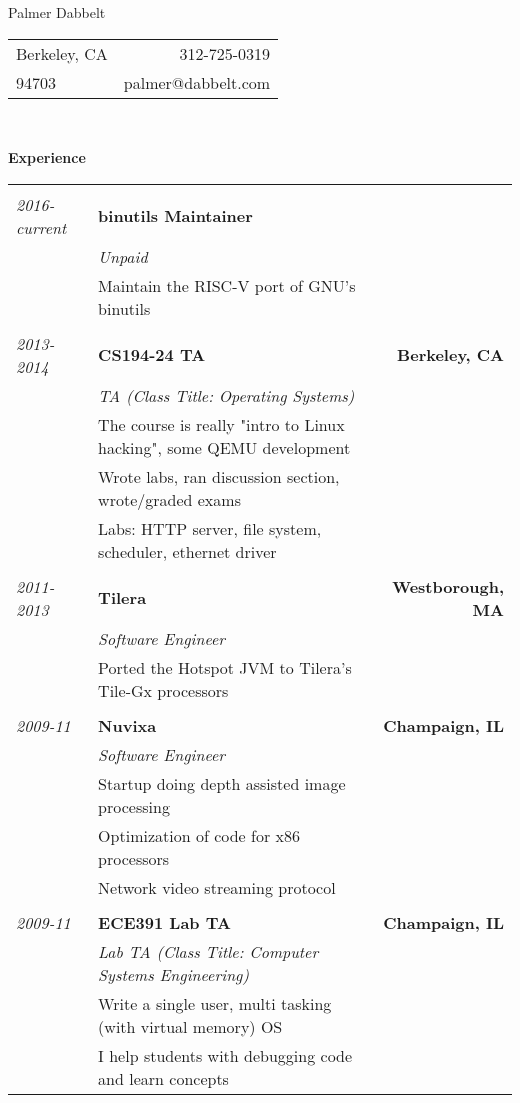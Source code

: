 \documentclass{letter}
\newcommand{\experience}[4]{&& \\
\textit{#1} \hspace{0.2in} & \textbf{#2} & \textbf{#3} \\
& \textit{#4} & \\}
\newcommand{\subexperience}[1]{& #1 & \\}
\begin{document}
\thispagestyle{empty}

\LARGE
\begin{center}Palmer Dabbelt\end{center}
\normalsize

\begin{tabular*}{\textwidth}{@{\extracolsep{\fill}} l r}
  Berkeley, CA& 312-725-0319 \\
  94703 & palmer@dabbelt.com \\
  \hline
\end{tabular*}\\
\vspace{0.2in}

\textbf{Experience}\\
\begin{tabular*}{\textwidth}{l l @{\extracolsep{\fill}} r}
  \experience{2016-current}{binutils Maintainer}{}{Unpaid}
  \subexperience{Maintain the RISC-V port of GNU's binutils}

  \experience{2013-2014}{CS194-24 TA}{Berkeley, CA}{TA (Class Title: Operating Systems)}
  \subexperience{The course is really "intro to Linux hacking", some QEMU development}
  \subexperience{Wrote labs, ran discussion section, wrote/graded exams}
  \subexperience{Labs: HTTP server, file system, scheduler, ethernet driver}

  \experience{2011-2013}{Tilera}{Westborough, MA}{Software Engineer}
  \subexperience{Ported the Hotspot JVM to Tilera's Tile-Gx processors}

  \experience{2009-11}{Nuvixa}{Champaign, IL}{Software Engineer}
  \subexperience{Startup doing depth assisted image processing}
  \subexperience{Optimization of code for x86 processors}
  \subexperience{Network video streaming protocol}
  
  \experience{2009-11}{ECE391 Lab TA}{Champaign, IL}{Lab TA (Class Title: Computer Systems Engineering)}
  \subexperience{Write a single user, multi tasking (with virtual memory) OS}
  \subexperience{I help students with debugging code and learn concepts}
\end{tabular*}\\
\vspace{0.2in}
\end{document}
